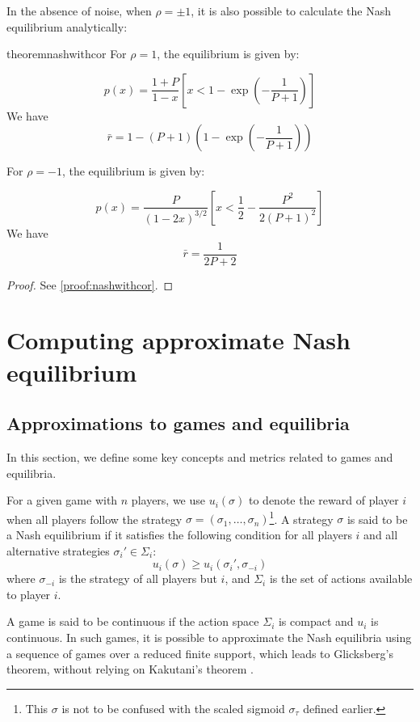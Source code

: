 \documentclass[preprint,12pt,authoryear]{elsarticle}
\theoremstyle{definition}
\begin{document}
In the absence of noise, when $\rho = \pm 1$, it is also possible to calculate the Nash equilibrium analytically:

\begin{restatable}{theorem}{nashwithcor}
\label{thm:nashwithcor}
        For $\rho = 1$, the equilibrium is given by:

    $$p(x) = \frac{1+P}{1-x} \left[x < 1 - \exp\left(-\frac{1}{P+1}\right)\right]$$ 
    We have $$\bar r = 1 - (P+1)\left(1-\exp\left(-\frac{1}{P+1}\right)\right)$$

    For $\rho = -1$, the equilibrium is given by:

    $$p(x) = \frac{P}{(1-2x)^{3/2}} \left[x < \frac{1}{2} - \frac{P^2}{2(P+1)^2}\right]$$
    We have  $$\bar r = \frac{1}{2P+2}$$

    
\end{restatable}
\begin{proof}
    See \ref{proof:nashwithcor}.    
\end{proof}
\section{Computing approximate Nash equilibrium}

\subsection{Approximations to games and equilibria}
\label{sec:approx}

In this section, we define some key concepts and metrics related to games and equilibria. 

For a given game with $n$ players, we use $u_i(\sigma)$ to denote the reward of player $i$ when all players follow the strategy $\sigma = (\sigma_1, \ldots, \sigma_n)$\footnote{This $\sigma$ is not to be confused with the scaled sigmoid $\sigma_\tau$ defined earlier.}. A strategy $\sigma$ is said to be a Nash equilibrium if it satisfies the following condition for all players $i$ and all alternative strategies $\sigma_i' \in \Sigma_i$: 
$$u_i(\sigma) \ge u_i(\sigma_i', \sigma_{-i})$$ 
where $\sigma_{-i}$ is the strategy of all players but $i$, and $\Sigma_i$ is the set of actions available to player $i$. 

A game is said to be continuous if the action space $\Sigma_i$ is compact and $u_i$ is continuous. In such games, it is possible to approximate the Nash equilibria using a sequence of games over a reduced finite support, which leads to Glicksberg’s theorem, without relying on Kakutani’s theorem \citep{myerson1997game}. 
\end{document}
